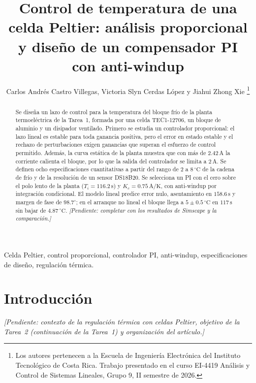 \documentclass[journal,twocolumn]{IEEEtran}
\newcommand{\pendiente}[1]{\textit{[Pendiente: #1]}}
\begin{document}
\title{Control de temperatura de una celda Peltier: análisis proporcional y diseño de un compensador PI con anti-windup}
\author{Carlos Andrés Castro Villegas, Victoria Slyn Cerdas López y Jiahui Zhong Xie%
\thanks{Los autores pertenecen a la Escuela de Ingeniería Electrónica del Instituto Tecnológico de Costa Rica. Trabajo presentado en el curso EI-4419 Análisis y Control de Sistemas Lineales, Grupo 9, II semestre de 2026.}}
\maketitle
\begin{abstract}
Se diseña un lazo de control para la temperatura del bloque frío de la planta termoeléctrica de la Tarea~1, formada por una celda TEC1-12706, un bloque de aluminio y un disipador ventilado. Primero se estudia un controlador proporcional: el lazo lineal es estable para toda ganancia positiva, pero el error en estado estable y el rechazo de perturbaciones exigen ganancias que superan el esfuerzo de control permitido. Además, la curva estática de la planta muestra que con más de $2.42\,\mathrm A$ la corriente calienta el bloque, por lo que la salida del controlador se limita a $2\,\mathrm A$. Se definen ocho especificaciones cuantitativas a partir del rango de $2$ a $8\,^\circ\mathrm C$ de la cadena de frío y de la resolución de un sensor DS18B20. Se selecciona un PI con el cero sobre el polo lento de la planta ($T_i=116.2\,\mathrm s$) y $K_c=0.75\,\mathrm{A/K}$, con anti-windup por integración condicional. El modelo lineal predice error nulo, asentamiento en $158.6\,\mathrm s$ y margen de fase de $98.7^\circ$; en el arranque no lineal el bloque llega a $5\pm0.5\,^\circ\mathrm C$ en $117\,\mathrm s$ sin bajar de $4.87\,^\circ\mathrm C$. \pendiente{completar con los resultados de Simscape y la comparación.}
\end{abstract}
\begin{IEEEkeywords}Celda Peltier, control proporcional, controlador PI, anti-windup, especificaciones de diseño, regulación térmica.\end{IEEEkeywords}

\section{Introducción}
\pendiente{contexto de la regulación térmica con celdas Peltier, objetivo de la Tarea~2 (continuación de la Tarea~1) y organización del artículo.}
\end{document}
